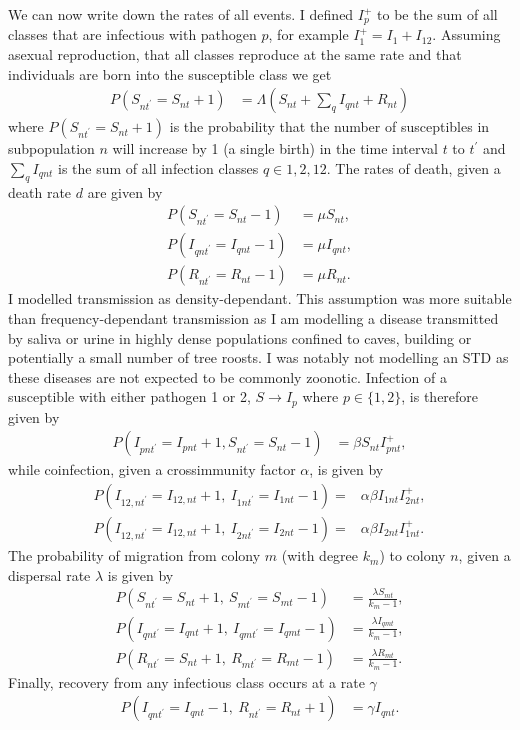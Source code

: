 We can now write down the rates of all events. 
I defined $I^+_p$ to be the sum of all classes that are infectious with pathogen $p$, for example $I^+_1 = I_1 + I_{12}$. 
Assuming asexual reproduction, that all classes reproduce at the same rate and that individuals are born into the susceptible class we get
\begin{align}
  P\left( S_{nt^\prime} = S_{nt} +1\right) &= \Lambda\left( S_{nt}+\sum_q I_{qnt} + R_{nt}\right) 
\end{align}
where $P\left( S_{nt^\prime} = S_{nt} +1\right)$ is the probability that the number of susceptibles in subpopulation $n$ will increase by 1 (a single birth) in the time interval $t$ to $t^\prime$ and $\sum_q I_{qnt}$ is the sum of all infection classes $q \in {1, 2, 12}$.
The rates of death, given a death rate $d$ are given by
\begin{align}
  P\left( S_{nt^\prime} = S_{nt}-1 \right) &= \mu S_{nt}, \\
  P\left( I_{qnt^\prime} = I_{qnt}-1 \right) &= \mu I_{qnt},\\
  P\left( R_{nt^\prime} = R_{nt}-1 \right) &= \mu R_{nt}.
\end{align}
I modelled transmission as density-dependant.
This assumption was more suitable than frequency-dependant transmission as I am modelling a disease transmitted by saliva or urine in highly dense populations confined to caves, building or potentially a small number of tree roosts.
I was notably not modelling an STD as these diseases are not expected to be commonly zoonotic.
Infection of a susceptible with either pathogen 1 or 2, $S \rightarrow I_p$ where $p\in \{1,2\}$, is therefore given by
\begin{align}
  P\left( I_{pnt^\prime} = I_{pnt}+1, S_{nt^\prime} = S_{nt}-1 \right) &= \beta S_{nt}I^+_{pnt},
\end{align}
while coinfection, given a crossimmunity factor $\alpha$, is given by
\begin{align}
  P\left( I_{12,nt^\prime} = I_{12,nt}+1,\: I_{1nt^\prime} = I_{1nt}-1\right) = &\alpha\beta I_{1nt}I^+_{2nt},\\
  P\left( I_{12,nt^\prime} = I_{12,nt}+1,\: I_{2nt^\prime} = I_{2nt}-1\right) = &\alpha\beta I_{2nt}I^+_{1nt}.
\end{align}
The probability of migration from colony $m$ (with degree $k_m$) to colony $n$, given a dispersal rate $\lambda$ is given by
\begin{align}
  P\left(S_{nt^\prime}=S_{nt}+1,\: S_{mt^\prime} = S_{mt}-1\right) &= \frac{\lambda S_{mt}}{k_m-1},\\
  P\left(I_{qnt^\prime}=I_{qnt}+1,\: I_{qmt^\prime} = I_{qmt}-1\right) &= \frac{\lambda I_{qmt}}{k_m-1},\\
  P\left(R_{nt^\prime}=S_{nt}+1,\: R_{mt^\prime} = R_{mt}-1\right) &= \frac{\lambda R_{mt}}{k_m-1}.
\end{align}
Finally, recovery from any infectious class occurs at a rate $\gamma$
\begin{align}
  P\left( I_{qnt^\prime} = I_{qnt}-1,\: R_{nt^\prime} = R_{nt}+1 \right) &= \gamma I_{qnt}.
\end{align}


